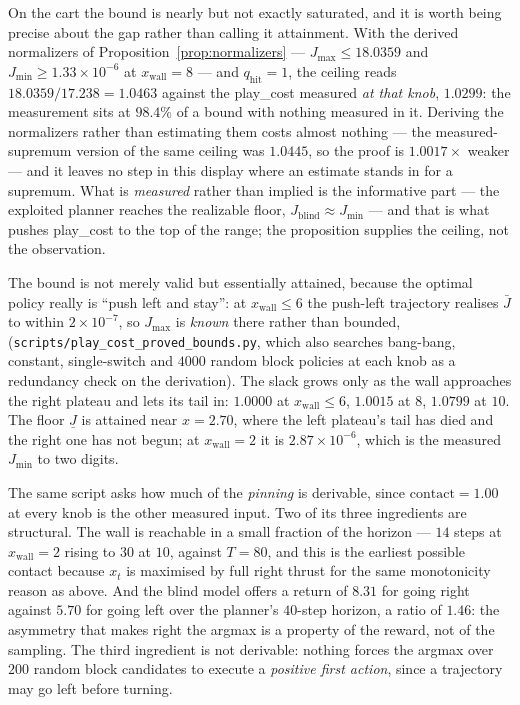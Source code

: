 \documentclass[11pt]{article}
\theoremstyle{definition}
\theoremstyle{remark}
\begin{document}
On the cart the bound is nearly but not exactly saturated, and it is worth being precise about the gap rather than calling it attainment. With the derived normalizers of Proposition~\ref{prop:normalizers} --- $J_{\max} \leq 18.0359$ and $J_{\min} \geq 1.33\times10^{-6}$ at $x_\mathrm{wall} = 8$ --- and $q_{\mathrm{hit}} = 1$, the ceiling reads $18.0359/17.238 = \mathbf{1.0463}$ against the play\_cost measured \emph{at that knob}, $1.0299$: the measurement sits at $98.4\%$ of a bound with nothing measured in it. Deriving the normalizers rather than estimating them costs almost nothing --- the measured-supremum version of the same ceiling was $1.0445$, so the proof is $1.0017\times$ weaker --- and it leaves no step in this display where an estimate stands in for a supremum. What is \emph{measured} rather than implied is the informative part --- the exploited planner reaches the realizable floor, $J_{\mathrm{blind}} \approx J_{\min}$ --- and that is what pushes play\_cost to the top of the range; the proposition supplies the ceiling, not the observation.

The bound is not merely valid but essentially attained, because the optimal policy really is ``push left and stay'': at $x_\mathrm{wall} \leq 6$ the push-left trajectory realises $\bar J$ to within $2\times10^{-7}$, so $J_{\max}$ is \emph{known} there rather than bounded, (\texttt{scripts/\allowbreak play\_\allowbreak cost\_\allowbreak proved\_\allowbreak bounds.py}, which also searches bang-bang, constant, single-switch and $4000$ random block policies at each knob as a redundancy check on the derivation). The slack grows only as the wall approaches the right plateau and lets its tail in: $1.0000$ at $x_\mathrm{wall} \leq 6$, $1.0015$ at $8$, $1.0799$ at $10$. The floor $\underline J$ is attained near $x = 2.70$, where the left plateau's tail has died and the right one has not begun; at $x_\mathrm{wall} = 2$ it is $2.87\times10^{-6}$, which is the measured $J_{\min}$ to two digits.

The same script asks how much of the \emph{pinning} is derivable, since $\mathrm{contact} = 1.00$ at every knob is the other measured input. Two of its three ingredients are structural. The wall is reachable in a small fraction of the horizon --- $14$ steps at $x_\mathrm{wall} = 2$ rising to $30$ at $10$, against $T = 80$, and this is the earliest possible contact because $x_t$ is maximised by full right thrust for the same monotonicity reason as above. And the blind model offers a return of $8.31$ for going right against $5.70$ for going left over the planner's $40$-step horizon, a ratio of $1.46$: the asymmetry that makes right the argmax is a property of the reward, not of the sampling. The third ingredient is not derivable: nothing forces the argmax over $200$ random block candidates to execute a \emph{positive first action}, since a trajectory may go left before turning.
\end{document}
